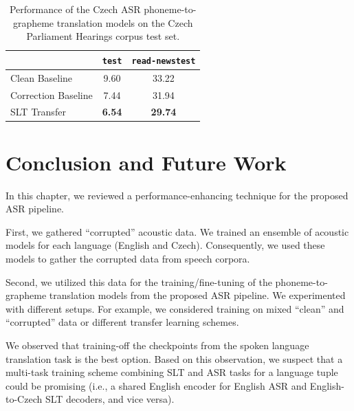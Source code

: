 \begin{table}[t]
	\centering
	\begin{tabular}{l|cc}
		&  \texttt{test} & \texttt{read-newstest} \\ \midrule
		Clean Baseline             & 9.60       &     33.22         \\
		
		Correction Baseline             & 7.44   & 31.94           \\
		
		SLT Transfer     & \textbf{6.54}   & \textbf{29.74}  \\
	\end{tabular}   
	\caption{Performance of the Czech ASR phoneme-to-grapheme translation models on the Czech Parliament Hearings corpus test set.}
	\label{tab:werstrain_cs}
\end{table}


\section{Conclusion and Future Work}
In this chapter, we reviewed a performance-enhancing technique for the proposed ASR pipeline.

First, we gathered ``corrupted'' acoustic data. We trained an ensemble of acoustic models for each language (English and Czech). Consequently, we used these models to gather the corrupted data from speech corpora.

Second, we utilized this data for the training/fine-tuning of the phoneme-to-grapheme translation models from the proposed ASR pipeline. We experimented with different setups. For example, we considered training on mixed ``clean'' and ``corrupted'' data or different transfer learning schemes.

We observed that training-off the checkpoints from the spoken language translation task is the best option. Based on this observation, we suspect that a multi-task training scheme combining SLT and ASR tasks for a language tuple could be promising (i.e., a shared English encoder for English ASR and English-to-Czech SLT decoders, and vice versa).

